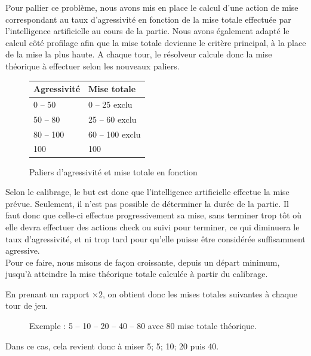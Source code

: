 \documentclass{report}
\begin{document}
Pour pallier ce problème, nous avons mis en place le calcul d'une action de mise correspondant au taux d'agressivité en fonction de la mise totale effectuée par l'intelligence artificielle au cours de la partie. Nous avons également adapté le calcul côté profilage afin que la mise totale devienne le critère principal, à la place de la mise la plus haute.
A chaque tour, le résolveur calcule donc la mise théorique à effectuer selon les nouveaux paliers.\par


\begin{figure}[H]
\begin{center}
\begin{tabular}{|l|l|}
	\hline
   Agressivité & Mise totale \\
   \hline
   0 – 50 & 0 – 25	exclu \\
   \hline
   50 – 80 & 25 – 60 exclu\\
   \hline
   80 – 100 & 60 – 100 exclu\\
   \hline
   100 & 100\\
   \hline
\end{tabular}	
\end{center}
\caption{Paliers d'agressivité et mise totale en fonction}
\end{figure}

Selon le calibrage, le but est donc que l'intelligence artificielle effectue la mise prévue. Seulement, il n'est pas possible de déterminer la durée de la partie. Il faut donc que celle-ci effectue progressivement sa mise, sans terminer trop tôt où elle devra effectuer des actions check ou suivi pour terminer, ce qui diminuera le taux d'agressivité, et ni trop tard pour qu'elle puisse être considérée suffisamment agressive.\\

Pour ce faire, nous misons de façon croissante, depuis un départ minimum, jusqu'à atteindre la mise théorique totale calculée à partir du calibrage.\par
En prenant un rapport $\times2$, on obtient donc les mises totales suivantes à chaque tour de jeu.\par

\begin{figure}[H]
\begin{center}
Exemple : 	5 – 10 – 20 – 40 – 80 		avec 80 mise totale théorique.
\end{center}
\end{figure}
Dans ce cas, cela revient donc à miser 5; 5; 10; 20 puis 40.\\
\end{document}
